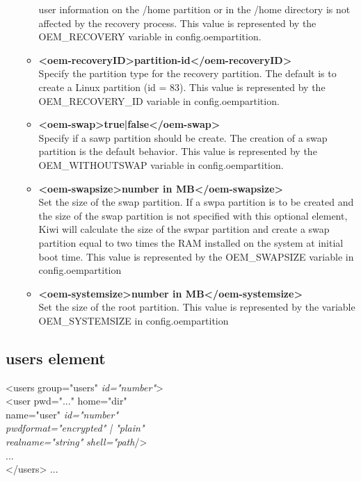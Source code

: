 \begin{itemize}
\begin{itemize}
      user information on the /home partition or in the /home directory is
      not affected by the recovery process. This value is represented by 
      the OEM\_RECOVERY variable in config.oempartition.
    \item \textbf{<oem-recoveryID>partition-id</oem-recoveryID>}\\
      Specify the partition type for the recovery partition. The default 
      is to create a Linux partition (id = 83). This value is represented by 
      the OEM\_RECOVERY\_ID variable in config.oempartition. 
    \item \textbf{<oem-swap>true|false</oem-swap>}\\
       Specify if a sawp partition should be create. The creation of a swap
       partition is the default behavior. This value is represented by the
       OEM\_WITHOUTSWAP variable in config.oempartition.     
	\item \textbf{<oem-swapsize>number in MB</oem-swapsize>}\\
       Set the size of the swap partition. If a swpa partition is to be
       created and the size of the swap partition is not specified with this
       optional element, Kiwi will calculate the size of the swpar partition
       and create a swap partition equal to two times the RAM installed on
       the system at initial boot time. This value is represented by
       the OEM\_SWAPSIZE variable in config.oempartition
	\item \textbf{<oem-systemsize>number in MB</oem-systemsize>}\\
      Set the size of the root partition. This value is represented by the
      variable OEM\_SYSTEMSIZE in config.oempartition
	\end{itemize}
\end{itemize}

\subsection{users element}
\begin{Command}{12cm}
<users group="users" \textit{id="number"}>\\
\hspace*{1cm}<user pwd="..." home="dir"\\ 
\hspace*{1.5cm}name="user" \textit{id="number"}\\
\hspace*{1.5cm}\textit{pwdformat="encrypted" | "plain"}\\
\hspace*{1.5cm}\textit{realname="string"} \textit{shell="path}/>\\
\hspace*{1cm}...\\
</users>
...
\end{Command}

